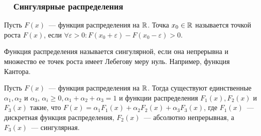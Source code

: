 \subsubsection*{~~Сингулярные распределения}
\begin{definition}
	Пусть $F(x)$~--- функция распределения на $\mathbb{R}$. Точка $x_0 \in \mathbb{R}$ называется точкой роста $F(x)$, если $\forall \varepsilon > 0: F(x_0 + \varepsilon) - F(x_0 - \varepsilon) > 0$.
\end{definition}
\begin{definition}
	Функция распределения называется сингулярной, если она непрерывна и множество ее точек роста имеет Лебегову меру нуль. Например, функция Кантора.
\end{definition}
\begin{theorem}
	Пусть $F(x)$~--- функция распределения на $\mathbb{R}$. Тогда существуют единственные $\alpha_1, \alpha_2$ и $\alpha_3$, $\alpha_i \geqslant 0, \alpha_1 + \alpha_2 + \alpha_3 = 1$ и функции распределения $F_1(x), F_2(x)$ и $F_3(x)$ такие, что $F(x) = \alpha_1 F_1(x) + \alpha_2 F_2(x) + \alpha_3 F_3(x)$, где $F_1(x)$~--- дискретная функция распределения, $F_2(x)$~--- абсолютно непрерывная, а $F_3(x)$~--- сингулярная. 
\end{theorem}